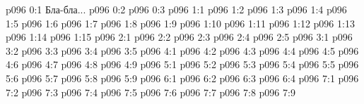 \author{Мелхиседек}
\vs p096 0:1  Бла-бла...
\vs p096 0:2 \pc 
\vs p096 0:3 
\vs p096 1:1 
\vs p096 1:2 
\vs p096 1:3 
\vs p096 1:4 
\vs p096 1:5 
\vs p096 1:6 
\vs p096 1:7 
\vs p096 1:8 
\vs p096 1:9 
\vs p096 1:10 \pc 
\vs p096 1:11 \pc 
\vs p096 1:12 
\vs p096 1:13 
\vs p096 1:14 
\vs p096 1:15 
\vs p096 2:1 
\vs p096 2:2 
\vs p096 2:3 
\vs p096 2:4 \pc 
\vs p096 2:5 
\vs p096 3:1 
\vs p096 3:2 
\vs p096 3:3 \pc 
\vs p096 3:4 
\vs p096 3:5 
\vs p096 4:1 
\vs p096 4:2 
\vs p096 4:3 
\vs p096 4:4 \pc 
\vs p096 4:5 \pc 
\vs p096 4:6 
\vs p096 4:7 
\vs p096 4:8 
\vs p096 4:9 
\vs p096 5:1 
\vs p096 5:2 
\vs p096 5:3 
\vs p096 5:4 \pc 
\vs p096 5:5 \pc 
\vs p096 5:6 
\vs p096 5:7 
\vs p096 5:8 
\vs p096 5:9 \pc 
{}
\vs p096 6:1 
\vs p096 6:2 
\vs p096 6:3 
\vs p096 6:4 
\vs p096 7:1 
\vs p096 7:2 \pc 
\vs p096 7:3 
\vs p096 7:4 
\vs p096 7:5 \pc 
\vs p096 7:6 
\vs p096 7:7 
\vs p096 7:8 
\vsetoff
\vs p096 7:9 
\quizlink
